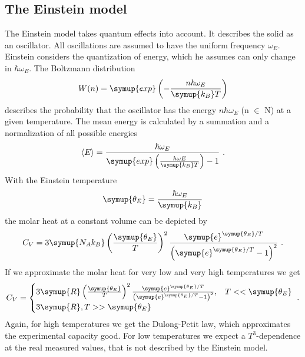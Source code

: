 \subsection{The Einstein model}
\label{sec:einstein}
The Einstein model takes quantum effects into account. It describes the solid as an oscillator. All oscillations are assumed to have the
uniform frequency $\omega_E$. Einstein considers the quantization of energy, which he assumes can only change in $\hbar \omega_E$. 
The Boltzmann distribution 
\begin{equation*}
    W(n)= \symup{exp}\left(-\frac{n\hbar \omega_E}{\symup{k_B}T}\right)
\end{equation*}
describes the probability that the oscillator has the energy $n\hbar\omega_E$ (n $\in$ N) at a given temperature. 
The mean energy is calculated by a summation and a normalization of all possible energies
\begin{equation*}
    \langle E \rangle = \frac{\hbar \omega_E}{\symup{exp} \left(\frac{\hbar \omega E}{\symup{k_B}T}\right)-1} \,\, .
\end{equation*}
With the Einstein temperature 
\begin{equation*}
    \symup{\theta_E} = \frac{\hbar \omega_E}{\symup{k_B}}
\end{equation*}
the molar heat at a constant volume can be depicted by 
\begin{equation*}
    C_V = 3\symup{N_A k_B}\left(\frac{\symup{\theta_E}}{T}\right)^2 \frac{\symup{e}^{\symup{\theta_E}/T}}{\left(\symup{e}^{\symup{\theta_E}/T}-1\right)^2} \,\, .
\end{equation*}
If we approximate the molar heat for very low and very high temperatures we get 
\begin{equation*}
    C_V = 
    \begin{cases}
        3 \symup{R}\left(\frac{\symup{\theta_E}}{T}\right)^2 \frac{\symup{e}^{\symup{\theta_E}/T}}{\left(\symup{e}^{\symup{\theta_E}/T}-1\right)^2} , & T << \symup{\theta_E} \\
        3 \symup{R} , T >> \symup{\theta_E}
    \end{cases}
    \, \, .
\end{equation*}
Again, for high temperatures we get the Dulong-Petit law, which approximates the experimental capacity good. For low temperatures we expect 
a $T^3$-dependence at the real measured values, that is not described by the Einstein model.

